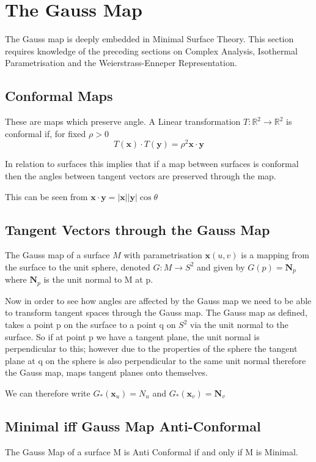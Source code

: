 \section{The Gauss Map}
The Gauss map is deeply embedded in Minimal Surface Theory. This section requires knowledge of the preceding sections on Complex Analysis, Isothermal Parametrisation and the Weierstrass-Enneper Representation.

\subsection{Conformal Maps}
These are maps which preserve angle. A Linear transformation $T:\mathbb R^2 \rightarrow \mathbb R^2$ is conformal if, for fixed $\rho > 0$
\begin{displaymath}
T(\mathbf x) \cdot T(\mathbf y) = \rho^2 \mathbf x \cdot \mathbf y
\end{displaymath}

In relation to surfaces this implies that if a map between surfaces is conformal then the angles between tangent vectors are preserved through the map.

This can be seen from $\mathbf x \cdot \mathbf y = |\mathbf x||\mathbf y|\cos \theta$

\subsection{Tangent Vectors through the Gauss Map}
The Gauss map of a surface $M$ with parametrisation $\mathbf x(u,v)$ is a mapping from the surface to the unit sphere, denoted $G:M \rightarrow S^2$ and given by $G(p)=\mathbf N_p$ where $\mathbf N_p$ is the unit normal to M at p.

Now in order to see how angles are affected by the Gauss map we need to be able to transform tangent spaces through the Gauss map. The Gauss map as defined, takes a point p on the surface to a point q on $S^2$ via the unit normal to the surface. So if at point p we have a tangent plane, the unit normal is perpendicular to this; however due to the properties of the sphere the tangent plane at q on the sphere is also perpendicular to the same unit normal therefore the Gauss map, maps tangent planes onto themselves.

We can therefore write $G_*(\mathbf x_u)=N_u$ and $G_*(\mathbf x_v) = \mathbf N_v$



\subsection{Minimal iff Gauss Map Anti-Conformal}
\begin{theorem}
The Gauss Map of a surface M is Anti Conformal if and only if M is Minimal.
\label{GMAntiC}
\end{theorem}

